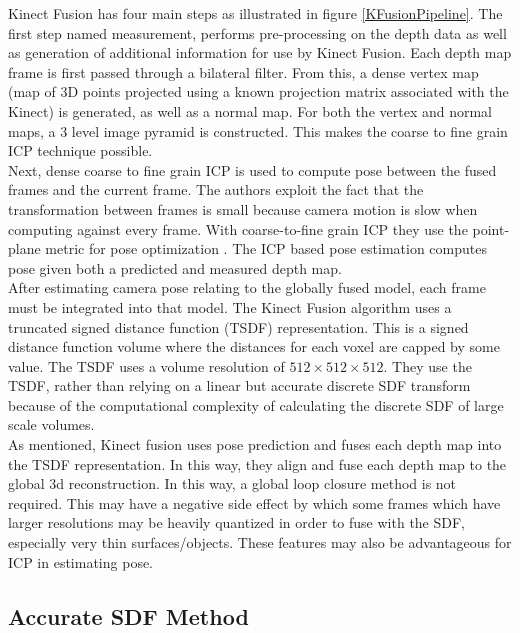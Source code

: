 Kinect Fusion has four main steps as illustrated in figure \ref{KFusionPipeline}. The first step named measurement, performs pre-processing on the depth data as well as generation of additional information for use by Kinect Fusion. Each depth map frame is first passed through a bilateral filter. From this, a dense vertex map (map of 3D points projected using a known projection matrix associated with the Kinect) is generated, as well as a normal map. For both the vertex and normal maps, a 3 level image pyramid is constructed. This makes the coarse to fine grain ICP technique possible. \\

Next, dense coarse to fine grain ICP is used to compute pose between the fused frames and the current frame. The authors exploit the fact that the transformation between frames is small because camera motion is slow when computing against every frame. With coarse-to-fine grain ICP they use the point-plane metric for pose optimization \cite{Rusinkiewicz02Real}. The ICP based pose estimation computes pose given both a predicted and measured depth map. \\

After estimating camera pose relating to the globally fused model, each frame must be integrated into that model. The Kinect Fusion algorithm uses a truncated signed distance function (TSDF) representation. This is a signed distance function volume where the distances for each voxel are capped by some value. The TSDF uses a volume resolution of $512\times 512\times 512$. They use the TSDF, rather than relying on a linear but accurate discrete SDF transform \cite{Rasch09Remarks} because of the computational complexity of calculating the discrete SDF of large scale volumes. \\

As mentioned, Kinect fusion uses pose prediction and fuses each depth map into the TSDF representation. In this way, they align and fuse each depth map to the global 3d reconstruction. In this way, a global loop closure method is not required. This may have a negative side effect by which some frames which have larger resolutions may be heavily quantized in order to fuse with the SDF, especially very thin surfaces/objects. These features may also be advantageous for ICP in estimating pose. 


\subsection{Accurate SDF Method \cite{Bylow13Real}}

